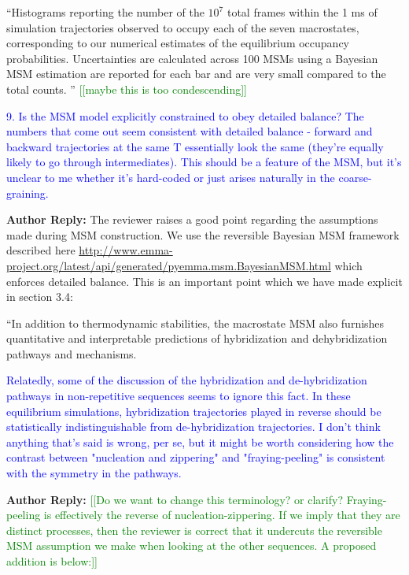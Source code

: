 \documentclass[11pt,a4paper]{letter} %
\newcommand*{\rood}[1]{{\color{red}{#1}}}
\newcommand*{\noteg}[1]{\textcolor{green}{[[#1]]}}		%
\begin{document}
``Histograms reporting the number of the $10^7$ total frames within the 1 ms of simulation trajectories observed to occupy each of the seven macrostates, corresponding to our numerical estimates of the equilibrium occupancy probabilities. Uncertainties are calculated across 100 MSMs using a Bayesian MSM estimation are reported for each bar and are very small compared to the total counts. \rood{Values are reported on a log y-axis to properly visualize less low-population states}'' \noteg{maybe this is too condescending}

\textcolor{blue}{9. Is the MSM model explicitly constrained to obey detailed balance? The numbers that come out seem consistent with detailed balance - forward and backward trajectories at the same T essentially look the same (they're equally likely to go through intermediates). This should be a feature of the MSM, but it's unclear to me whether it's hard-coded or just arises naturally in the coarse-graining.}

\textbf{Author Reply:}    The reviewer raises a good point regarding the assumptions made during MSM construction. We use the reversible Bayesian MSM framework described here \url{http://www.emma-project.org/latest/api/generated/pyemma.msm.BayesianMSM.html} which enforces detailed balance. This is an important point which we have made explicit in section 3.4:

``In addition to thermodynamic stabilities, the macrostate MSM also furnishes quantitative and interpretable predictions of hybridization and dehybridization pathways and mechanisms. \rood{It should be noted that because we are using a reversible MSM framework, detailed balance is enforced by construction.''}

\textcolor{blue}{Relatedly, some of the discussion of the hybridization and de-hybridization pathways in non-repetitive sequences seems to ignore this fact. In these equilibrium simulations, hybridization trajectories played in reverse should be statistically indistinguishable from de-hybridization trajectories. I don't think anything that's said is wrong, per se, but it might be worth considering how the contrast between "nucleation and zippering" and "fraying-peeling" is consistent with the symmetry in the pathways.}

\textbf{Author Reply:}  \noteg{Do we want to change this terminology? or clarify? Fraying-peeling is effectively the reverse of nucleation-zippering. If we imply that they are distinct processes, then the reviewer is correct that it undercuts the reversible MSM assumption we make when looking at the other sequences. A proposed addition is below:}
\end{document}
